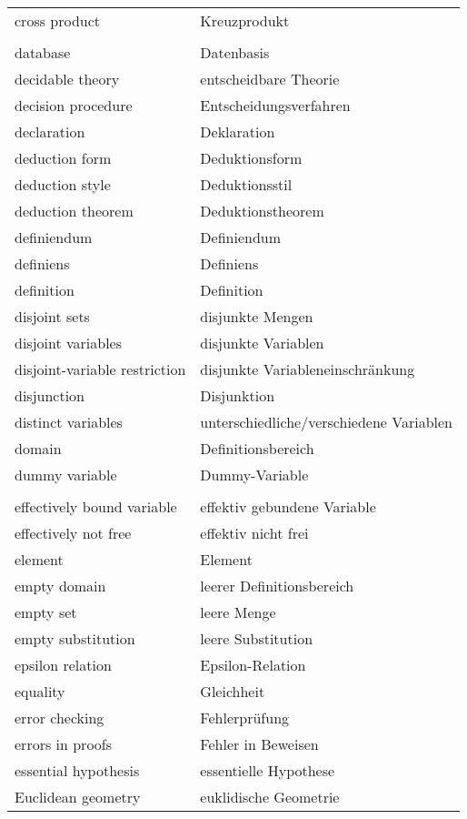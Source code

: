 \begin{longtabu}   { @{} X[l] X[l] }
    cross product & Kreuzprodukt \\
     & \\
    database & Datenbasis \\
    decidable theory & entscheidbare Theorie \\
    decision procedure & Entscheidungsverfahren \\
    declaration & Deklaration \\
    deduction form & Deduktionsform \\
    deduction style & Deduktionsstil \\
    deduction theorem & Deduktionstheorem \\
    definiendum & Definiendum \\
    definiens & Definiens \\
    definition & Definition \\
    disjoint sets & disjunkte Mengen \\
    disjoint variables & disjunkte Variablen \\
    disjoint-variable restriction & disjunkte Variableneinschränkung \\
    disjunction & Disjunktion \\
    distinct variables & \hangindent=0.5cm unterschiedliche/verschiedene Variablen\vspace{3pt} \\
    domain & Definitionsbereich \\
    dummy variable & Dummy-Variable \\
     & \\
    effectively bound variable & effektiv gebundene Variable \\
    effectively not free & effektiv nicht frei \\
    element & Element \\
    empty domain & leerer Definitionsbereich \\
    empty set & leere Menge \\
    empty substitution & leere Substitution \\
    epsilon relation & Epsilon-Relation \\
    equality & Gleichheit \\
    error checking & Fehlerprüfung \\
    errors in proofs & Fehler in Beweisen \\
    essential hypothesis & essentielle Hypothese \\
    Euclidean geometry & euklidische Geometrie \\

\end{longtabu}
